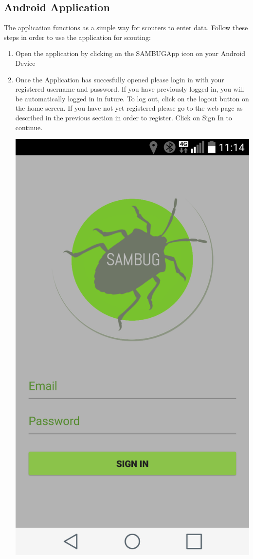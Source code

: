 \documentclass[11pt,a4paper,titlepage]{article}
\begin{document}
\subsection{Android Application}
	The application functions as a simple way for scouters to enter data. Follow these steps in order to use the application for scouting:
	\begin{enumerate}
		\item Open the application by clicking on the SAMBUGApp icon on your Android Device
		\item Once the Application has succesfully opened please login in with your registered username and password. If you have previously logged in, you will be automatically logged in in future. To log out, click on the logout button on the home screen. If you have not yet registered please go to the web page as described in the previous section in order to register. Click on Sign In to continue.
			\begin{center}
				\includegraphics[scale=0.11]{login}

\end{center}
\end{enumerate}
\end{document}
